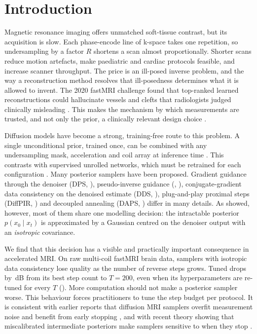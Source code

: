 %    

\section{Introduction}
\label{sec:intro}

Magnetic resonance imaging offers unmatched soft-tissue contrast, but its
acquisition is slow. Each phase-encode line of k-space takes one repetition, so
undersampling by a factor $R$ shortens a scan almost proportionally. Shorter
scans reduce motion artefacts, make paediatric and cardiac protocols feasible,
and increase scanner throughput. The price is an ill-posed inverse problem, and
the way a reconstruction method resolves that ill-posedness determines what it
is allowed to invent. The 2020 fastMRI challenge found that top-ranked
learned reconstructions could hallucinate vessels and clefts that radiologists
judged clinically misleading \citep{muckley2021fastmri}. This makes the
mechanism by which measurements are trusted, and not only the prior, a
clinically relevant design choice \citep{bhadra2021hallucination}.

Diffusion models have become a strong, training-free route to this problem.
A single unconditional prior, trained once, can be combined with any
undersampling mask, acceleration and coil array at inference time
\citep{jalal2021robust,chung2022scoremri,aali2025ambient}. This contrasts
with supervised unrolled networks, which must be retrained for each
configuration \citep{sriram2020varnet}. Many posterior samplers have been
proposed. Gradient guidance through the denoiser (DPS,
\citealp{chung2023dps}), pseudo-inverse guidance (\pigdm,
\citealp{song2023pigdm}), conjugate-gradient data consistency on the denoised
estimate (DDS, \citealp{chung2024dds}), plug-and-play proximal steps (DiffPIR,
\citealp{zhu2023diffpir}) and decoupled annealing (DAPS,
\citealp{zhang2025daps}) differ in many details. As \citet{peng2024optimal}
showed, however, most of them share one modelling decision: the intractable
posterior $p(x_0\mid x_t)$ is approximated by a Gaussian centred on the
denoiser output with an \emph{isotropic} covariance.

We find that this decision has a visible and practically important
consequence in accelerated MRI. On raw multi-coil fastMRI brain data, samplers
with isotropic data consistency lose quality as the number of reverse steps
grows. Tuned \pigdm{} drops by \xx\,dB from its best step count to $T{=}200$,
even when its hyperparameters are re-tuned for every $T$
(). More computation should not make a posterior sampler
worse. This behaviour forces practitioners to tune the step budget per protocol.
It is consistent with earlier reports that diffusion MRI samplers overfit
measurement noise and benefit from early stopping
\citep{ozturkler2023smrd}, and with recent theory showing that miscalibrated
intermediate posteriors make samplers sensitive to when they stop
\citep{burns2026finite}.

